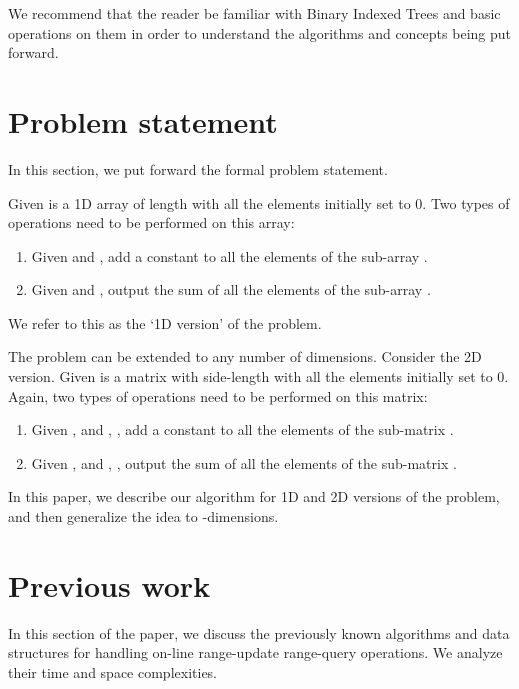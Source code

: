 \documentclass[a4paper]{article}
\begin{document}
\vspace{2 mm}
We recommend that the reader be familiar with Binary Indexed Trees and basic operations on them\cite{BIT} in order to understand the algorithms and concepts being put forward.



\section{Problem statement}
In this section, we put forward the formal problem statement.

\vspace{2 mm}
Given is a 1D array  of length  with all the elements initially set to 0. Two types of operations need to be performed on this array:

\begin{enumerate}
\item Given  and , add a constant  to all the elements of the sub-array .
\item Given  and , output the sum of all the elements of the sub-array .
\end{enumerate}
We refer to this as the `1D version' of the problem.

\vspace{2 mm}
The problem can be extended to any number of dimensions. Consider the 2D version. Given is a matrix  with side-length  with all the elements initially set to 0. Again, two types of operations need to be performed on this matrix:
\begin{enumerate}
\item Given ,  and , , add a constant  to all the elements of the sub-matrix .
\item Given ,  and , , output the sum of all the elements of the sub-matrix .
\end{enumerate}

\vspace{2 mm}
\noindent
In this paper, we describe our algorithm for 1D and 2D versions of the problem, and then generalize the idea to -dimensions.



\section{Previous work}
In this section of the paper, we discuss the previously known algorithms and data structures for handling on-line range-update range-query operations. We analyze their time and space complexities.
\end{document}
